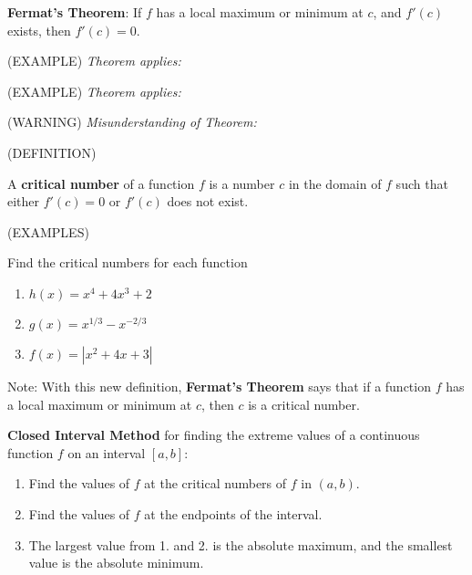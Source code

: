 \documentclass[11pt]{article}
\begin{document}
    {\bf Fermat's Theorem}:  If $f$ has a local maximum or minimum at $c$, and $f'(c)$ exists, then $f'(c)=0$.

    \vspace{2.5in}

    (EXAMPLE) \emph{ Theorem applies:}


    \vspace{1.5in}
    
    (EXAMPLE)  \emph{Theorem applies:}

    \vspace{1.5in}

    (WARNING)  \emph{Misunderstanding of Theorem:}    


    \vspace{1.5in}
    

         \pagebreak

(DEFINITION)

 A {\bf critical number} of a function $f$ is a number $c$ in the domain of $f$ such that either $f'(c)=0$ or $f'(c)$ does not exist.

 \vspace{.1in}
 
 (EXAMPLES)

 Find the critical numbers for each function

 \begin{enumerate}
 \item{$h(x) = x^4+4x^3+2$}
   \vspace{2in}
 \item{$g(x) = x^{1/3}-x^{-2/3}$}
   \vspace{2in}
 \item{$f(x) = |x^2+4x+3|$}
   \vspace{2in}
 \end{enumerate}

 
 Note:  With this new definition, {\bf Fermat's Theorem} says that if a function $f$ has a local maximum or minimum at $c$, then
 $c$ is a critical number.

\pagebreak

{\bf Closed Interval Method} for finding the extreme values of a continuous function $f$ on an interval $[a,b]$:
\begin{enumerate}
\item{Find the values of $f$ at the critical numbers of $f$ in $(a,b)$.}
\item{Find the values of $f$ at the endpoints of the interval.}
    \item{The largest value from 1. and 2. is the absolute maximum, and the smallest value is the absolute minimum.}
\end{enumerate}  
\end{document}
